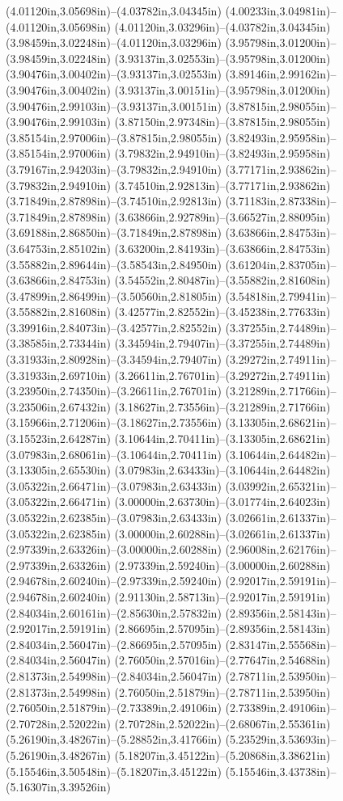 (4.01120in,3.05698in)--(4.03782in,3.04345in) (4.00233in,3.04981in)--(4.01120in,3.05698in) (4.01120in,3.03296in)--(4.03782in,3.04345in) (3.98459in,3.02248in)--(4.01120in,3.03296in) (3.95798in,3.01200in)--(3.98459in,3.02248in) (3.93137in,3.02553in)--(3.95798in,3.01200in) (3.90476in,3.00402in)--(3.93137in,3.02553in) (3.89146in,2.99162in)--(3.90476in,3.00402in) (3.93137in,3.00151in)--(3.95798in,3.01200in) (3.90476in,2.99103in)--(3.93137in,3.00151in) (3.87815in,2.98055in)--(3.90476in,2.99103in) (3.87150in,2.97348in)--(3.87815in,2.98055in) (3.85154in,2.97006in)--(3.87815in,2.98055in) (3.82493in,2.95958in)--(3.85154in,2.97006in) (3.79832in,2.94910in)--(3.82493in,2.95958in) (3.79167in,2.94203in)--(3.79832in,2.94910in) (3.77171in,2.93862in)--(3.79832in,2.94910in) (3.74510in,2.92813in)--(3.77171in,2.93862in) (3.71849in,2.87898in)--(3.74510in,2.92813in) (3.71183in,2.87338in)--(3.71849in,2.87898in) (3.63866in,2.92789in)--(3.66527in,2.88095in) (3.69188in,2.86850in)--(3.71849in,2.87898in) (3.63866in,2.84753in)--(3.64753in,2.85102in) (3.63200in,2.84193in)--(3.63866in,2.84753in) (3.55882in,2.89644in)--(3.58543in,2.84950in) (3.61204in,2.83705in)--(3.63866in,2.84753in) (3.54552in,2.80487in)--(3.55882in,2.81608in) (3.47899in,2.86499in)--(3.50560in,2.81805in) (3.54818in,2.79941in)--(3.55882in,2.81608in) (3.42577in,2.82552in)--(3.45238in,2.77633in) (3.39916in,2.84073in)--(3.42577in,2.82552in) (3.37255in,2.74489in)--(3.38585in,2.73344in) (3.34594in,2.79407in)--(3.37255in,2.74489in) (3.31933in,2.80928in)--(3.34594in,2.79407in) (3.29272in,2.74911in)--(3.31933in,2.69710in) (3.26611in,2.76701in)--(3.29272in,2.74911in) (3.23950in,2.74350in)--(3.26611in,2.76701in) (3.21289in,2.71766in)--(3.23506in,2.67432in) (3.18627in,2.73556in)--(3.21289in,2.71766in) (3.15966in,2.71206in)--(3.18627in,2.73556in) (3.13305in,2.68621in)--(3.15523in,2.64287in) (3.10644in,2.70411in)--(3.13305in,2.68621in) (3.07983in,2.68061in)--(3.10644in,2.70411in) (3.10644in,2.64482in)--(3.13305in,2.65530in) (3.07983in,2.63433in)--(3.10644in,2.64482in) (3.05322in,2.66471in)--(3.07983in,2.63433in) (3.03992in,2.65321in)--(3.05322in,2.66471in) (3.00000in,2.63730in)--(3.01774in,2.64023in) (3.05322in,2.62385in)--(3.07983in,2.63433in) (3.02661in,2.61337in)--(3.05322in,2.62385in) (3.00000in,2.60288in)--(3.02661in,2.61337in) (2.97339in,2.63326in)--(3.00000in,2.60288in) (2.96008in,2.62176in)--(2.97339in,2.63326in) (2.97339in,2.59240in)--(3.00000in,2.60288in) (2.94678in,2.60240in)--(2.97339in,2.59240in) (2.92017in,2.59191in)--(2.94678in,2.60240in) (2.91130in,2.58713in)--(2.92017in,2.59191in) (2.84034in,2.60161in)--(2.85630in,2.57832in) (2.89356in,2.58143in)--(2.92017in,2.59191in) (2.86695in,2.57095in)--(2.89356in,2.58143in) (2.84034in,2.56047in)--(2.86695in,2.57095in) (2.83147in,2.55568in)--(2.84034in,2.56047in) (2.76050in,2.57016in)--(2.77647in,2.54688in) (2.81373in,2.54998in)--(2.84034in,2.56047in) (2.78711in,2.53950in)--(2.81373in,2.54998in) (2.76050in,2.51879in)--(2.78711in,2.53950in) (2.76050in,2.51879in)--(2.73389in,2.49106in) (2.73389in,2.49106in)--(2.70728in,2.52022in) (2.70728in,2.52022in)--(2.68067in,2.55361in) (5.26190in,3.48267in)--(5.28852in,3.41766in) (5.23529in,3.53693in)--(5.26190in,3.48267in) (5.18207in,3.45122in)--(5.20868in,3.38621in) (5.15546in,3.50548in)--(5.18207in,3.45122in) (5.15546in,3.43738in)--(5.16307in,3.39526in) 